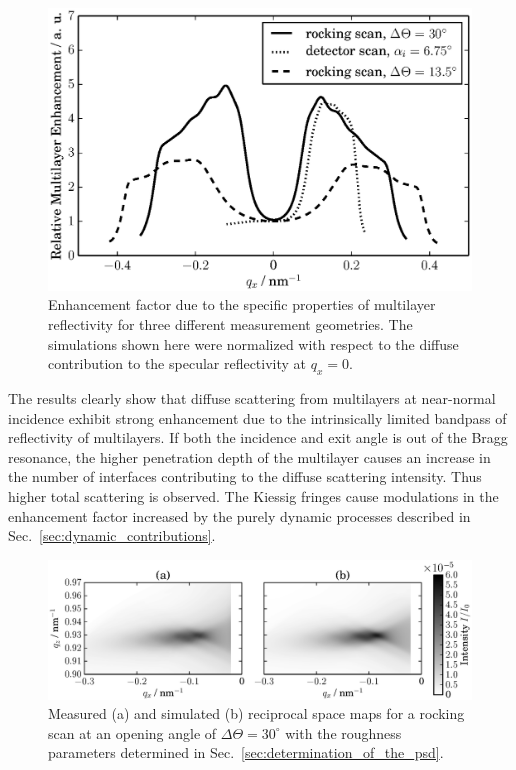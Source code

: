 \begin{figure}[htbp]
	\includegraphics[width=0.7
	\textwidth]{images/MEF} \caption{Enhancement factor due to the specific properties of multilayer reflectivity for three different measurement geometries. The simulations shown here were normalized with respect to the diffuse contribution to the specular reflectivity at $q_x=0$.} \label{fig:MultilayerInfluence} 
\end{figure}

The results clearly show that diffuse scattering from multilayers at near-normal incidence exhibit strong enhancement due to the intrinsically limited bandpass of reflectivity of multilayers. If both the incidence and exit angle is out of the Bragg resonance, the higher penetration depth of the multilayer causes an increase in the number of interfaces contributing to the diffuse scattering intensity. Thus higher total scattering is observed. The Kiessig fringes cause modulations in the enhancement factor increased by the purely dynamic processes described in Sec.~\ref{sec:dynamic_contributions}.

\begin{figure}[htbp]
        \includegraphics[width=
        \textwidth]{images/simulation_vs_measurement} \caption{Measured (a) and simulated (b) reciprocal space maps for a rocking scan at an opening angle of $\Delta\Theta=30^\circ$ with the roughness parameters determined in Sec.~\ref{sec:determination_of_the_psd}.} \label{fig:comparisonWithTheory} 
\end{figure}

